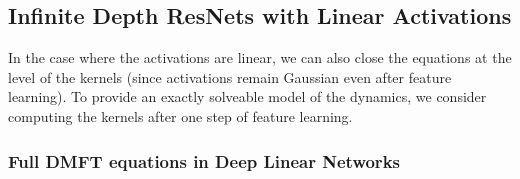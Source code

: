 \documentclass{article} %
\begin{document}
\subsection{Infinite Depth ResNets with Linear Activations}\label{app:linear_dmft_eqns}

In the case where the activations are linear, we can also close the equations at the level of the kernels (since activations remain Gaussian even after feature learning). To provide an exactly solveable model of the dynamics, we consider computing the kernels after one step of feature learning. 

\subsubsection{Full DMFT equations in Deep Linear Networks}
\end{document}
